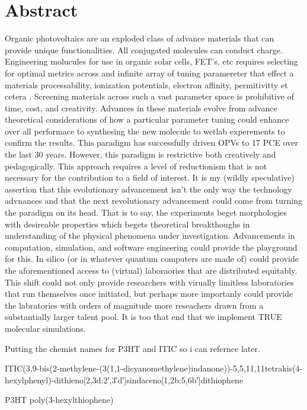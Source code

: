 
\chapter*{Abstract}

Organic photovoltaics are an exploded  class of advance materials that can provide unique functionalities.
All conjugated molecules can conduct charge. 
Engineering molucules for use in organic solar cells, FET's, etc 
requires selecting for optimal metrics across and infinite array of tuning paramereter that effect a materials
processability, ionization potentials, electron affinity, permitivitty et cetera . 
Screening materials across
such a vast parameter space is prohibitive of time, cost, and creativity. Advances in these materials evolve
from advance theoretical considerations of how a particular parameter tuning could enhance over all performace
to synthesing the new molecule to wetlab experements to confirm the results. This paradigm has successfully
driven OPVs to 17 PCE over the last 30 years. However, this paradigm is restrictive both creatively and
pedagogically. This approach requires a level of reductionism that is not necessary for the contribution to a
field of interest. It is my (wildly speculative) assertion that this evolutionary advancement isn't the only
way the technology advnances and that the next revolutionary advancement could come from turning the paradigm
on its head. That is to say, the experiments beget morphologies with desireable properties which begets
theoretical breakthoughs in understanding of the physical phenomena under investigation. Advancements in
computation, simulation, and software engineering could provide the playground for this. In silico (or in
whatever quantum computers are made of) could provide the aforementioned access to (virtual) laboraories that
are distributed equitably. This shift could not only provide researchers with virually limitless 
laboratories that run themselves once initiated, but perhaps more importanly could provide the labratories
with orders of magnitude more reseachers drawn from a substantially larger talent pool. It is too that end
that we implement TRUE molecular simulations.    

Putting the chemist names for P3HT and ITIC so i can refernce later. 

ITIC(3,9-bis(2-methylene-(3(1,1-dicyanomethylene)indanone))-5,5,11,11tetrakis(4-hexylphenyl)-dithieno[2,3d:2′,3′d′]sindaceno[1,2b:5,6b′]dithiophene

P3HT poly(3-hexylthiophene)





